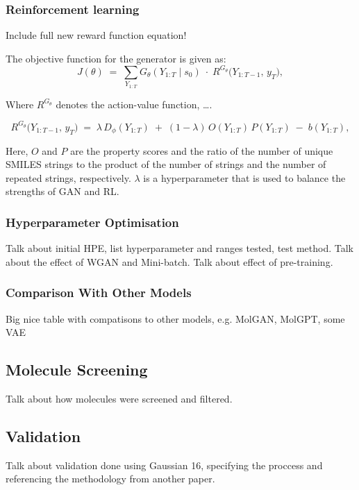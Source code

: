 \documentclass[journal=ENFL,manuscript=article]{achemso}
\begin{document}
\subsubsection{Reinforcement learning}
Include full new reward function equation!

The objective function for the generator is given as:
\begin{equation}
    J(\theta) \;=\; \sum_{Y_{1:T}} G_{\theta}(Y_{1:T}\mid s_{0}) \;\cdot\; R^{G_{\theta}}\bigl(Y_{1:T-1},\,y_{T}\bigr), \label{eqn:objFunc}
\end{equation}

Where $R^{G_{\theta}}$ denotes the action-value function, \dots. 

\begin{equation}
    R^{G_{\theta}}\bigl(Y_{1:T-1},\,y_{T}\bigr)
\;=\;
\lambda\,D_{\phi}(Y_{1:T})
\;+\;(1-\lambda)\,O(Y_{1:T})\,P(Y_{1:T})
\;-\;b(Y_{1:T}), \label{eqn:actValFunc}
\end{equation}

Here, $O$ and $P$ are the property scores and the ratio of the number of unique SMILES strings to the product of the number of strings and the number of repeated strings, respectively. $\lambda$ is a hyperparameter that is used to balance the strengths of GAN and RL.

\subsubsection{Hyperparameter Optimisation}
Talk about initial HPE, list hyperparameter and ranges tested, test method. Talk about the effect of WGAN and Mini-batch. Talk about effect of pre-training. 


\subsubsection{Comparison With Other Models}
Big nice table with compatisons to other models, e.g. MolGAN, MolGPT, some VAE

\subsection{Molecule Screening}
Talk about how molecules were screened and filtered. 

\subsection{Validation}
Talk about validation done using Gaussian 16, specifying the proccess and referencing the methodology from another paper. 
\end{document}
